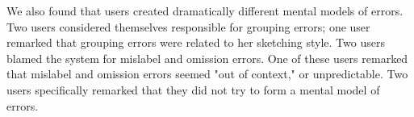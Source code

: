 \documentclass{egpubl}
\begin{document}



We also found that users created dramatically different mental models
of errors.  Two users considered themselves responsible for grouping
errors; one user remarked that grouping errors were related to her
sketching style.  Two users blamed the system for mislabel and
omission errors.  One of these users remarked that mislabel and
omission errors seemed "out of context," or unpredictable.  Two users
specifically remarked that they did not try to form a mental model of
errors.  
\end{document}
